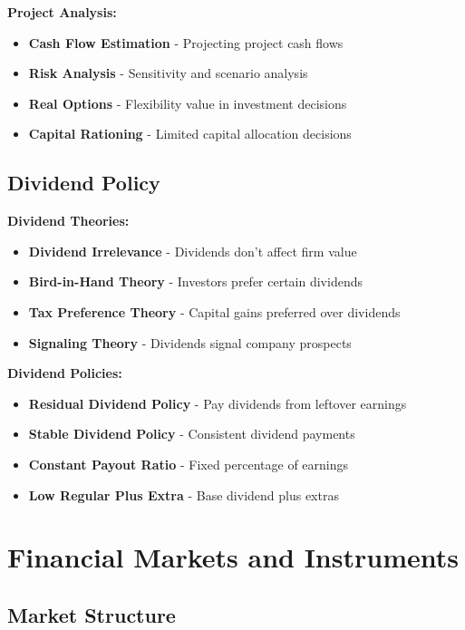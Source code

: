\documentclass[12pt]{article}
\begin{document}
\textbf{Project Analysis:}
\begin{itemize}
    \item \textbf{Cash Flow Estimation} - Projecting project cash flows
    \item \textbf{Risk Analysis} - Sensitivity and scenario analysis
    \item \textbf{Real Options} - Flexibility value in investment decisions
    \item \textbf{Capital Rationing} - Limited capital allocation decisions
\end{itemize}

\subsection{Dividend Policy}

\textbf{Dividend Theories:}
\begin{itemize}
    \item \textbf{Dividend Irrelevance} - Dividends don't affect firm value
    \item \textbf{Bird-in-Hand Theory} - Investors prefer certain dividends
    \item \textbf{Tax Preference Theory} - Capital gains preferred over dividends
    \item \textbf{Signaling Theory} - Dividends signal company prospects
\end{itemize}

\textbf{Dividend Policies:}
\begin{itemize}
    \item \textbf{Residual Dividend Policy} - Pay dividends from leftover earnings
    \item \textbf{Stable Dividend Policy} - Consistent dividend payments
    \item \textbf{Constant Payout Ratio} - Fixed percentage of earnings
    \item \textbf{Low Regular Plus Extra} - Base dividend plus extras
\end{itemize}

\section{Financial Markets and Instruments}

\subsection{Market Structure}
\end{document}
